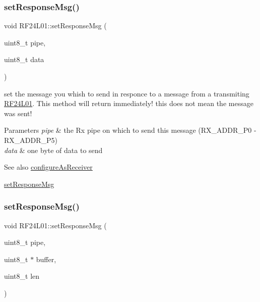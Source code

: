 \subsubsection{\texorpdfstring{set\+Response\+Msg()}{setResponseMsg()}\hspace{0.1cm}{\footnotesize\ttfamily [1/2]}}
{\footnotesize\ttfamily void R\+F24\+L01\+::set\+Response\+Msg (\begin{DoxyParamCaption}\item[{uint8\+\_\+t}]{pipe,  }\item[{uint8\+\_\+t}]{data }\end{DoxyParamCaption})}

set the message you whish to send in responce to a message from a transmiting \mbox{\hyperlink{namespace_r_f24_l01}{R\+F24\+L01}}. This method will return immediately! this does not mean the message was sent! 
\begin{DoxyParams}{Parameters}
{\em pipe} & the Rx pipe on which to send this message (R\+X\+\_\+\+A\+D\+D\+R\+\_\+\+P0 -\/ R\+X\+\_\+\+A\+D\+D\+R\+\_\+\+P5) \\
\hline
{\em data} & one byte of data to send \\
\hline
\end{DoxyParams}
\begin{DoxySeeAlso}{See also}
\mbox{\hyperlink{namespace_r_f24_l01_ac6a39c4cfff9cf552bb772a264cc9a8c}{configure\+As\+Receiver}} 

\mbox{\hyperlink{namespace_r_f24_l01_a909555c7340573af8f698610b9cfe497}{set\+Response\+Msg}} 
\end{DoxySeeAlso}
\mbox{\label{namespace_r_f24_l01_a19a402017e07bee1a0191e5cff84f1ca}} 
\subsubsection{\texorpdfstring{set\+Response\+Msg()}{setResponseMsg()}\hspace{0.1cm}{\footnotesize\ttfamily [2/2]}}
{\footnotesize\ttfamily void R\+F24\+L01\+::set\+Response\+Msg (\begin{DoxyParamCaption}\item[{uint8\+\_\+t}]{pipe,  }\item[{uint8\+\_\+t $\ast$}]{buffer,  }\item[{uint8\+\_\+t}]{len }\end{DoxyParamCaption})}

